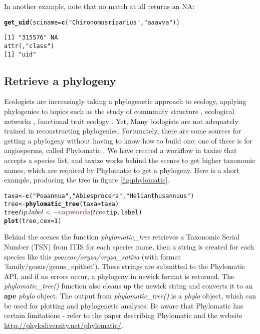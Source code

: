 \documentclass[10pt]{article}\usepackage[]{graphicx}\usepackage[]{color}
\makeatletter
\newcommand{\hlstr}[1]{\textcolor[rgb]{0.192,0.494,0.8}{#1}}%
\newcommand{\hlkwd}[1]{\textcolor[rgb]{0.737,0.353,0.396}{\textbf{#1}}}%
\newenvironment{kframe}{%
 \def\at@end@of@kframe{}%
 \ifinner\ifhmode%
  \def\at@end@of@kframe{\end{minipage}}%
  \begin{minipage}{\columnwidth}%
 \fi\fi%
 \def\FrameCommand##1{\hskip\@totalleftmargin \hskip-\fboxsep
 \colorbox{shadecolor}{##1}\hskip-\fboxsep
     \hskip-\linewidth \hskip-\@totalleftmargin \hskip\columnwidth}%
 \MakeFramed {\advance\hsize-\width
   \@totalleftmargin\z@ \linewidth\hsize
   \@setminipage}}%
 {\par\unskip\endMakeFramed%
 \at@end@of@kframe}
\newenvironment{knitrout}{}{} %
\makeatother
\begin{document}
In another example, note that no match at all returns an NA:

\begin{knitrout}
\color{fgcolor}\begin{kframe}
\begin{alltt}
\hlkwd{get_uid}(sciname = \hlkwd{c}(\hlstr{"Chironomus riparius"}, \hlstr{"aaa vva"}))
\end{alltt}
\begin{verbatim}
[1] "315576" NA      
attr(,"class")
[1] "uid"
\end{verbatim}
\end{kframe}
\end{knitrout}


\subsection*{Retrieve a phylogeny}
Ecologists are increasingly taking a phylogenetic approach to ecology, applying phylogenies to topics such as the study of community structure \cite{webb2002phylogenies}, ecological networks \cite{rafferty2013phylogenetic}, functional trait ecology \cite{poff2006functional}. Yet, Many biologists are not adequately trained in reconstructing phylogenies. Fortunately, there are some sources for getting a phylogeny without having to know how to build one; one of these is for angiosperms, called Phylomatic \cite{webb2005}. We have created a workflow in taxize that accepts a species list, and taxize works behind the scenes to get higher taxonomic names, which are required by Phylomatic to get a phylogeny. Here is a short example, producing the tree in figure \ref{fig:phylomatic}.

\begin{knitrout}
\color{fgcolor}\begin{kframe}
\begin{alltt}
taxa <- \hlkwd{c}(\hlstr{"Poa annua"}, \hlstr{"Abies procera"}, \hlstr{"Helianthus annuus"})
tree <- \hlkwd{phylomatic_tree}(taxa = taxa)
tree$tip.label <- \hlkwd{capwords}(tree$tip.label)
\hlkwd{plot}(tree, cex = 1)
\end{alltt}
\end{kframe}
\end{knitrout}





Behind the scenes the function \emph{phylomatic\_tree} retrieves a Taxonomic Serial Number (TSN) from ITIS for each species name, then a string is created for each species like this \emph{poaceae/oryza/oryza\_sativa} (with format 'family/genus/genus\_epithet'). These strings are submitted to the Phylomatic API, and if no errors occur, a phylogeny in newick format is returned. The \emph{phylomatic\_tree()} function also cleans up the newick string and converts it to an \textbf{ape} \emph{phylo} object. The output from \emph{phylomatic\_tree()} is a \emph{phylo} object, which can be used for plotting and phylogenetic analyses. Be aware that Phylomatic has certain limitations - refer to the paper describing Phylomatic \cite{webb2005} and the website \url{http://phylodiversity.net/phylomatic/}.
\end{document}
